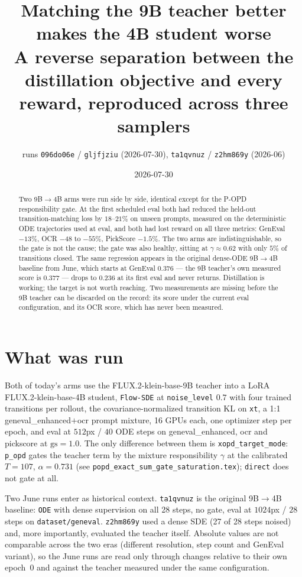 \documentclass[11pt,a4paper]{article}
\title{\textbf{Matching the 9B teacher better makes the 4B student worse}\\[0.3em]
\large A reverse separation between the distillation objective and every reward,
reproduced across three samplers}
\author{runs \texttt{096do06e} / \texttt{gljfjziu} (2026-07-30), \texttt{ta1qvnuz} /
\texttt{z2hm869y} (2026-06)}
\date{2026-07-30}
\begin{document}
\maketitle

\begin{abstract}
Two 9B$\to$4B arms were run side by side, identical except for the P-OPD responsibility gate. At
the first scheduled eval both had reduced the held-out transition-matching loss by $18$--$21\%$ on
unseen prompts, measured on the deterministic ODE trajectories used at eval, and both had lost
reward on all three metrics: GenEval $-13\%$, OCR $-48$ to $-55\%$, PickScore $-1.5\%$. The two
arms are indistinguishable, so the gate is not the cause; the gate was also healthy, sitting at
$\gamma\approx0.62$ with only $5\%$ of transitions closed. The same regression appears in the
original dense-ODE 9B$\to$4B baseline from June, which starts at GenEval $0.376$ --- the 9B
teacher's own measured score is $0.377$ --- drops to $0.236$ at its first eval and never returns.
Distillation is working; the target is not worth reaching. Two measurements are missing before the
9B teacher can be discarded on the record: its score under the current eval configuration, and its
OCR score, which has never been measured.
\end{abstract}

\tableofcontents

\section{What was run}
\label{sec:setup}

Both of today's arms use the FLUX.2-klein-base-9B teacher into a LoRA FLUX.2-klein-base-4B
student, \texttt{Flow-SDE} at \texttt{noise\_level} $0.7$ with four trained transitions per
rollout, the covariance-normalized transition KL on \texttt{xt}, a 1:1 geneval\_enhanced$+$ocr
prompt mixture, 16 GPUs each, one optimizer step per epoch, and eval at $512$px / $40$ ODE steps
on geneval\_enhanced, ocr and pickscore at $\mathrm{gs}=1.0$. The only difference between them is
\texttt{xopd\_target\_mode}: \texttt{p\_opd} gates the teacher term by the mixture responsibility
$\gamma$ at the calibrated $T=107$, $\alpha=0.731$ (see
\texttt{popd\_exact\_sum\_gate\_saturation.tex}); \texttt{direct} does not gate at all.

Two June runs enter as historical context. \texttt{ta1qvnuz} is the original 9B$\to$4B baseline:
\texttt{ODE} with dense supervision on all 28 steps, no gate, eval at $1024$px / $28$ steps on
\texttt{dataset/geneval}. \texttt{z2hm869y} used a dense SDE (27 of 28 steps noised) and, more
importantly, evaluated the teacher itself. Absolute values are not comparable across the two eras
(different resolution, step count and GenEval variant), so the June runs are read only through
changes relative to their own epoch~0 and against the teacher measured under the same
configuration.
\end{document}
